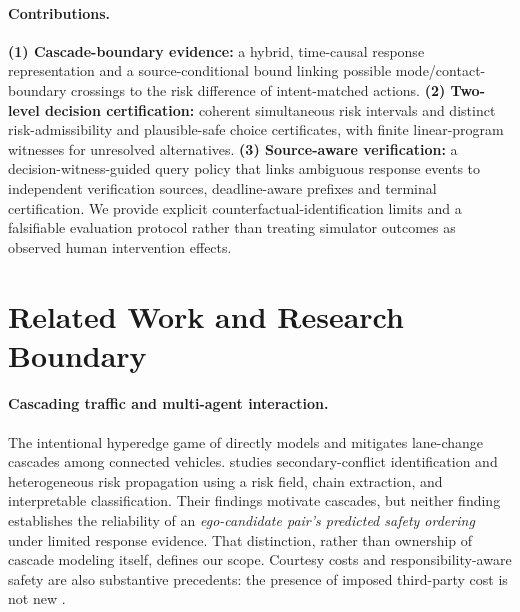 \documentclass[10pt]{article}
\begin{document}
\paragraph{Contributions.}
\textbf{(1) Cascade-boundary evidence:} a hybrid, time-causal response representation and a source-conditional bound linking possible mode/contact-boundary crossings to the risk difference of intent-matched actions. \textbf{(2) Two-level decision certification:} coherent simultaneous risk intervals and distinct risk-admissibility and plausible-safe choice certificates, with finite linear-program witnesses for unresolved alternatives. \textbf{(3) Source-aware verification:} a decision-witness-guided query policy that links ambiguous response events to independent verification sources, deadline-aware prefixes and terminal certification. We provide explicit counterfactual-identification limits and a falsifiable evaluation protocol rather than treating simulator outcomes as observed human intervention effects.

\section{Related Work and Research Boundary}
\label{sec:related}
\paragraph{Cascading traffic and multi-agent interaction.}
The intentional hyperedge game of \textcite{li2025mitigating} directly models and mitigates lane-change cascades among connected vehicles. \textcite{luo2025analysis} studies secondary-conflict identification and heterogeneous risk propagation using a risk field, chain extraction, and interpretable classification. Their findings motivate cascades, but neither finding establishes the reliability of an \emph{ego-candidate pair's predicted safety ordering} under limited response evidence. That distinction, rather than ownership of cascade modeling itself, defines our scope. Courtesy costs and responsibility-aware safety are also substantive precedents: the presence of imposed third-party cost is not new \parencite{sun2018courteous,cosner2023learning}.
\end{document}
